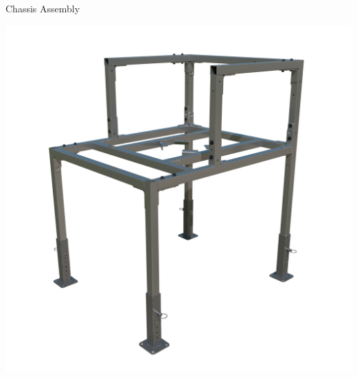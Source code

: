 \documentclass[a5paper,portrait]{article}
\begin{document}
\newpage
\centering
\vspace*{2cm}
        {\color{mainblue}\sffamily\Huge Chassis Assembly}\\[1cm]
\begin{center}
            \includegraphics[width=1\textwidth]{../images/Chap1_render.png}
\end{center}
     
\newpage



\newpage



\newpage



\newpage



\newpage



\newpage



\newpage



\newpage



\newpage


\end{document}
